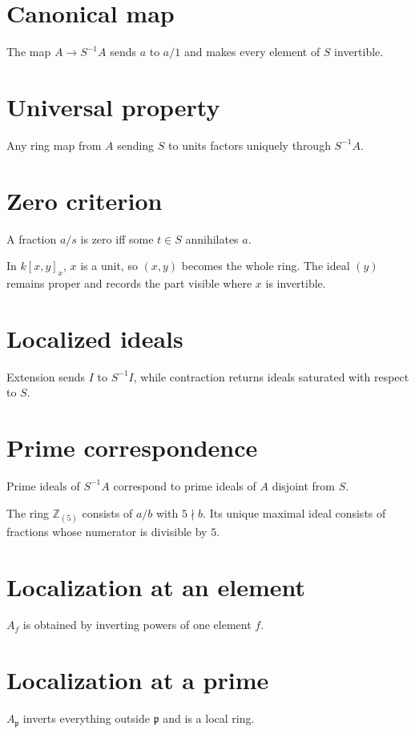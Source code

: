 \section{Canonical map}
The map $A\to S^{-1}A$ sends $a$ to $a/1$ and makes every element of $S$ invertible.

\section{Universal property}
Any ring map from $A$ sending $S$ to units factors uniquely through $S^{-1}A$.

\section{Zero criterion}
A fraction $a/s$ is zero iff some $t\in S$ annihilates $a$.

\begin{example}\label{ex:v06-expand-02}
In $k[x,y]_x$, $x$ is a unit, so $(x,y)$ becomes the whole ring. The ideal $(y)$ remains proper and records the part visible where $x$ is invertible.
\end{example}
\section{Localized ideals}
Extension sends $I$ to $S^{-1}I$, while contraction returns ideals saturated with respect to $S$.

\section{Prime correspondence}
Prime ideals of $S^{-1}A$ correspond to prime ideals of $A$ disjoint from $S$.

\begin{example}\label{ex:v06-expand-03}
The ring $\mathbb Z_{(5)}$ consists of $a/b$ with $5\nmid b$. Its unique maximal ideal consists of fractions whose numerator is divisible by $5$.
\end{example}
\section{Localization at an element}
$A_f$ is obtained by inverting powers of one element $f$.

\section{Localization at a prime}
$A_{\mathfrak p}$ inverts everything outside $\mathfrak p$ and is a local ring.

